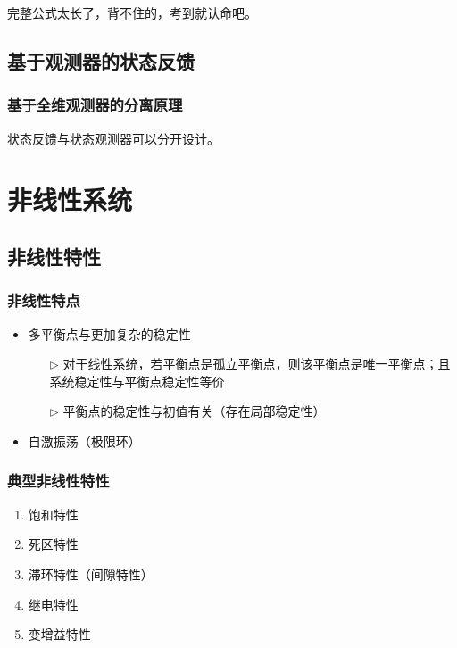 \documentclass[14pt,a4paper]{article}
\theoremstyle{plain}
\theoremstyle{definition}
\theoremstyle{remark}
\theoremstyle{plain}
\theoremstyle{plain}
\theoremstyle{plain}
\theoremstyle{definition}
\theoremstyle{remark}
\numberwithin{equation}{section}
\begin{document}
				完整公式太长了，背不住的，考到就认命吧。

		\subsection{基于观测器的状态反馈}%
		\label{sub:基于观测器的状态反馈}
		
			\subsubsection{基于全维观测器的分离原理}%
			\label{ssub:基于全维观测器的分离原理}
			
				状态反馈与状态观测器可以分开设计。		



	\newpage
	\section{非线性系统}%
	\label{sec:非线性系统}

		\subsection{非线性特性}%
		\label{sub:非线性特性}
		
			\subsubsection{非线性特点}%
			\label{ssub:非线性特点}
			
				\begin{itemize}
					\item 多平衡点与更加复杂的稳定性
						\begin{itemize}
							\item[$\triangleright$] 对于线性系统，若平衡点是孤立平衡点，则该平衡点是唯一平衡点；且系统稳定性与平衡点稳定性等价
							\item[$\triangleright$] 平衡点的稳定性与初值有关（存在局部稳定性）
						\end{itemize}  
					\item 自激振荡（极限环）
				\end{itemize}  

			\subsubsection{典型非线性特性}%
			\label{ssub:典型非线性特性}
			
				\begin{enumerate}
					\item 饱和特性
					\item 死区特性 
					\item 滞环特性（间隙特性）
					\item 继电特性
					\item 变增益特性
				\end{enumerate} 
\end{document}
